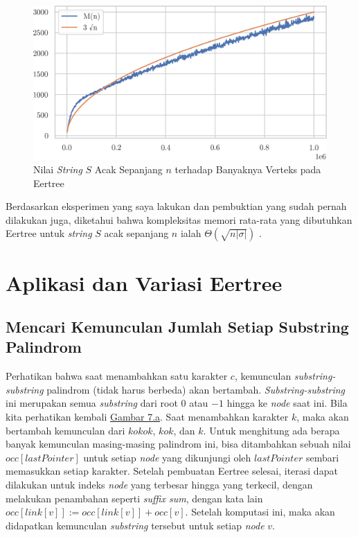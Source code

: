 \documentclass[11pt, a4paper, final]{article}
\begin{document}
\begin{figure}[H]
\centering
\includegraphics[scale=1]{assets/memory.png}
\caption{Nilai \textit{String} $S$ Acak Sepanjang $n$ terhadap Banyaknya Verteks pada Eertree}
\end{figure}

Berdasarkan eksperimen yang saya lakukan dan pembuktian yang sudah pernah dilakukan juga, diketahui bahwa kompleksitas memori rata-rata yang dibutuhkan Eertree untuk \textit{string} $S$ acak sepanjang $n$ ialah $\Theta(\sqrt{n|\sigma|})$ \cite{rubinchik2016number}.

\section{Aplikasi dan Variasi Eertree}

\subsection{Mencari Kemunculan Jumlah Setiap Substring Palindrom}

Perhatikan bahwa saat menambahkan satu karakter $c$, kemunculan \textit{substring-substring} palindrom (tidak harus berbeda) akan bertambah. \textit{Substring-substring} ini merupakan semua \textit{substring} dari root $0$ atau $-1$ hingga ke \textit{node} saat ini. Bila kita perhatikan kembali \hyperref[eer9]{Gambar 7.a}. Saat menambahkan karakter $k$, maka akan bertambah kemunculan dari $kokok$, $kok$, dan $k$. Untuk menghitung ada berapa banyak kemunculan masing-masing palindrom ini, bisa ditambahkan sebuah nilai $occ[lastPointer]$ untuk setiap \textit{node} yang dikunjungi oleh $lastPointer$ sembari memasukkan setiap karakter. Setelah pembuatan Eertree selesai, iterasi dapat dilakukan untuk indeks \textit{node} yang terbesar hingga yang terkecil, dengan melakukan penambahan seperti \textit{suffix sum}, dengan kata lain $occ[link[v]] := occ[link[v]] + occ[v]$. Setelah komputasi ini, maka akan didapatkan kemunculan \textit{substring} tersebut untuk setiap \textit{node} $v$.
\end{document}

